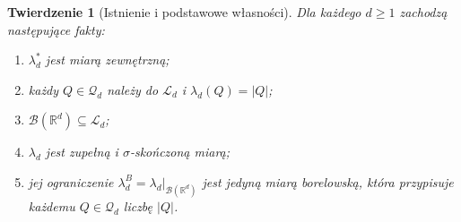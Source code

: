 \documentclass[11pt,a4paper,oneside]{book}
\numberwithin{equation}{chapter}
\theoremstyle{plain}
\newtheorem{twierdzenie}{Twierdzenie}[chapter]
\theoremstyle{definition}
\theoremstyle{remark}
\begin{document}
\begin{twierdzenie}[Istnienie i podstawowe własności]
\label{thm:lebesgue-exists}
Dla każdego $d\ge1$ zachodzą następujące fakty:
\begin{enumerate}[label=\textup{(\roman*)}]
\item $\lambda_d^*$ jest miarą zewnętrzną;
\item każdy $Q\in\mathcal Q_d$ należy do $\mathcal L_d$ i
$\lambda_d(Q)=|Q|$;
\item $\mathcal B(\mathbb R^d)\subseteq\mathcal L_d$;
\item $\lambda_d$ jest zupełną i $\sigma$-skończoną miarą;
\item jej ograniczenie
$\lambda_d^B=\lambda_d|_{\mathcal B(\mathbb R^d)}$
jest jedyną miarą borelowską, która przypisuje każdemu
$Q\in\mathcal Q_d$ liczbę $|Q|$.
\end{enumerate}
\end{twierdzenie}
\end{document}
